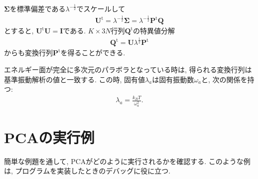 $\mathbf{\Sigma}$を標準偏差である$\lambda^{-\frac{1}{2}}$でスケールして
\begin{align}
  \mathbf{U}^{\mathrm{t}} =
  \lambda^{-\frac{1}{2}} \mathbf{\Sigma} =
  \lambda^{-\frac{1}{2}} \mathbf{P}^{\mathrm{t}} \mathbf{Q}
\end{align}
とすると, $\mathbf{U}^{\mathrm{t}}\mathbf{U} = \mathbf{I}$である.
$K \times 3N$行列$\mathbf{Q}^{\mathrm{t}}$の特異値分解
\begin{align}
  \mathbf{Q}^{\mathrm{t}} = \mathbf{U} \lambda^{\frac{1}{2}} \mathbf{P}^{\mathrm{t}}
\end{align}
からも変換行列$\mathbf{P}^{\mathrm{t}}$を得ることができる.

エネルギー面が完全に多次元のパラボラとなっている時は,
得られる変換行列は基準振動解析の値と一致する.
この時, 固有値$\lambda_{a}$は固有振動数$\omega_{a}$と, 次の関係を持つ\cite{1991Kitao, 1999Kitao, 2001Kitao}:
\begin{align}
  \lambda_{a} = \frac{k_{B}T}{\omega_{a}^{2}}.
\end{align}

\section{PCAの実行例}

簡単な例題を通して, PCAがどのように実行されるかを確認する. 
このような例は, プログラムを実装したときのデバッグに役に立つ. 

